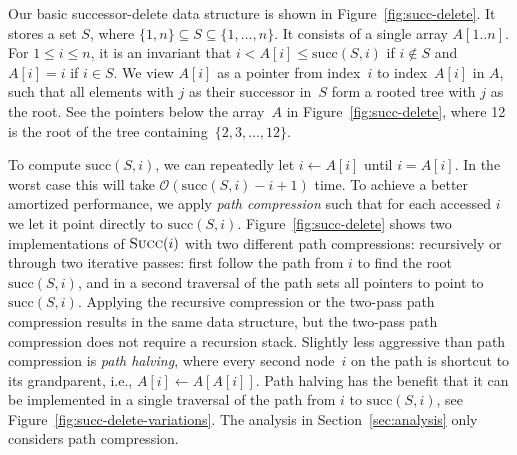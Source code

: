 \documentclass[a4paper]{lipics-v2021}
\newcommand{\Oh}{\mathcal{O}}
\newcommand{\successor}{\mathrm{succ}}
\newcommand{\FuncName}[1]{\textup{\textsc{#1}}}
\newcommand{\Succ}{\FuncName{Succ}}
\begin{document}
Our basic successor-delete data structure is shown in Figure~\ref{fig:succ-delete}. It stores a set $S$, where $\{1, n\} \subseteq S \subseteq \{1, \ldots, n\}$. It consists of a single array $A[1..n]$. For $1\leq i\leq n$, it is an invariant that $i < A[i] \leq \successor(S, i)$ if $i\notin S$ and $A[i] = i$ if $i \in S$. We view $A[i]$ as a pointer from index~$i$ to index~$A[i]$ in $A$, such that all elements with $j$ as their successor in~$S$ form a rooted tree with $j$ as the root. See the pointers below the array~$A$ in Figure~\ref{fig:succ-delete}, where 12 is the root of the tree containing~$\{2,3,\ldots,12\}$.

To compute $\successor(S, i)$, we can repeatedly let $i \leftarrow A[i]$ until $i=A[i]$. In the worst case this will take $\Oh(\successor(S, i)-i+1)$ time. To achieve a better amortized performance, we apply \emph{path compression} such that for each accessed $i$ we let it point directly to $\successor(S,i)$. Figure~\ref{fig:succ-delete} shows two implementations of $\Succ(i)$ with two different path compressions: recursively or through two iterative passes: first follow the path from $i$ to find the root $\successor(S, i)$, and in a second traversal of the path sets all pointers to point to $\successor(S, i)$. Applying the recursive compression or the two-pass path compression results in the same data structure, but the two-pass path compression does not require a recursion stack. Slightly less aggressive than path compression is \emph{path halving}, where every second node~$i$ on the path is shortcut to its grandparent, i.e., $A[i]\leftarrow A[A[i]]$. Path halving has the benefit that it can be implemented in a single traversal of the path from $i$ to $\successor(S, i)$, see Figure~\ref{fig:succ-delete-variations}. The analysis in Section~\ref{sec:analysis} only considers path compression.
\end{document}
